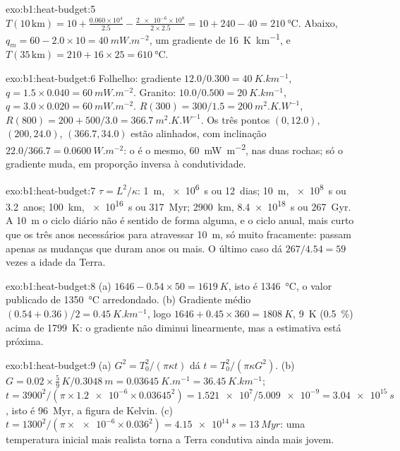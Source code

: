 \begin{solution}{exo:b1:heat-budget:5}
$T(10\,\text{km}) = 10 + \frac{0.060\times10^4}{2.5} - \frac{\num{2e-6}\times10^8}{2\times2.5}
= 10 + 240 - 40 = \qty{210}{\degreeCelsius}$. Abaixo, $q_m = 60 - 2.0\times10 =
\qty{40}{mW.m^{-2}}$, um gradiente de \qty{16}{K.km^{-1}}, e
$T(35\,\text{km}) = 210 + 16\times25 = \qty{610}{\degreeCelsius}$.
\end{solution}

\begin{solution}{exo:b1:heat-budget:6}
Folhelho: gradiente $12.0/0.300 = \qty{40}{K.km^{-1}}$, $q = 1.5\times0.040 =
\qty{60}{mW.m^{-2}}$. Granito: $10.0/0.500 = \qty{20}{K.km^{-1}}$,
$q = 3.0\times0.020 = \qty{60}{mW.m^{-2}}$. $R(300) = 300/1.5 =
\qty{200}{m^2.K.W^{-1}}$, $R(800) = 200 + 500/3.0 = \qty{366.7}{m^2.K.W^{-1}}$.
Os três pontos $(0, 12.0)$, $(200, 24.0)$, $(366.7, 34.0)$ estão alinhados, com
inclinação $22.0/366.7 = \qty{0.0600}{W.m^{-2}}$: o  é o mesmo,
\qty{60}{mW.m^{-2}}, nas duas rochas; só o gradiente muda, em proporção inversa
à condutividade.
\end{solution}

\begin{solution}{exo:b1:heat-budget:7}
$\tau = L^2/\kappa$: \qty{1}{m}, \qty{e6}{s} ou \num{12}~dias; \qty{10}{m},
\qty{e8}{s} ou \num{3.2}~anos; \qty{100}{km}, \qty{e16}{s} ou
\qty{317}{Myr}; \qty{2900}{km}, \qty{8.4e18}{s} ou \qty{267}{Gyr}. A
\qty{10}{m} o ciclo diário não é sentido de forma alguma, e o ciclo anual, mais curto
que os três anos necessários para atravessar \qty{10}{m}, só muito fracamente: passam
apenas as mudanças que duram anos ou mais. O último caso dá $267/4.54 = 59$ vezes a
idade da Terra.
\end{solution}

\begin{solution}{exo:b1:heat-budget:8}
(a) $1646 - 0.54\times50 = \qty{1619}{K}$, isto é \qty{1346}{\degreeCelsius},
o valor publicado de \qty{1350}{\degreeCelsius} arredondado. (b) Gradiente médio
$(0.54 + 0.36)/2 = \qty{0.45}{K.km^{-1}}$, logo $1646 + 0.45\times360 =
\qty{1808}{K}$, \qty{9}{K} (\qty{0.5}{\percent}) acima de \qty{1799}{K}: o
gradiente não diminui linearmente, mas a estimativa está próxima.
\end{solution}

\begin{solution}{exo:b1:heat-budget:9}
(a) $G^2 = T_0^2/(\pi\kappa t)$ dá $t = T_0^2/(\pi\kappa G^2)$.
(b) $G = 0.02\times\tfrac59\,\unit{K}/\qty{0.3048}{m} = \qty{0.03645}{K.m^{-1}} =
\qty{36.45}{K.km^{-1}}$; $t = 3900^2/(\pi\times\num{1.2e-6}\times0.03645^2) =
\num{1.521e7}/\num{5.009e-9} = \qty{3.04e15}{s}$, isto é \qty{96}{Myr},
a figura de Kelvin. (c) $t = 1300^2/(\pi\times\num{e-6}\times0.036^2) =
\qty{4.15e14}{s} = \qty{13}{Myr}$: uma temperatura inicial mais realista torna a
Terra condutiva ainda mais jovem.
\end{solution}

